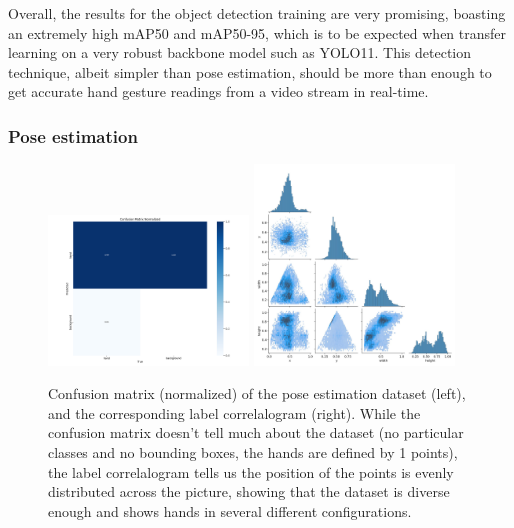 \documentclass[12pt]{article}
\begin{document}
Overall, the results for the object detection training are very promising, boasting an extremely high mAP50 and mAP50-95, which is to be expected when transfer learning on a very robust backbone model such as YOLO11. This detection technique, albeit simpler than pose estimation, should be more than enough to get accurate hand gesture readings from a video stream in real-time.

\subsubsection{Pose estimation}

\begin{figure}[H]
  \centering
  \includegraphics[width=0.475\textwidth]{./pictures/pose_confusion_matrix_normalized.png}
  \hspace{\fill}
  \includegraphics[width=0.475\textwidth]{./pictures/pose_labels_correlogram.jpg}
  \caption{Confusion matrix (normalized) of the pose estimation dataset (left), and the corresponding label correlalogram (right). While the confusion matrix doesn't tell much about the dataset (no particular classes and no bounding boxes, the hands are defined by 1 points), the label correlalogram tells us the position of the points is evenly distributed across the picture, showing that the dataset is diverse enough and shows hands in several different configurations.}
\end{figure}
\end{document}
